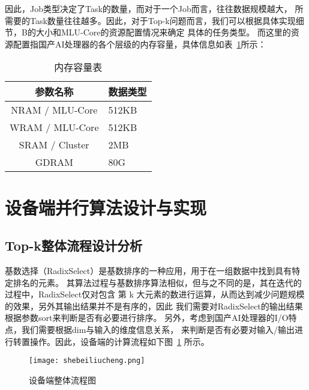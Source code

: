         因此，Job类型决定了Task的数量，而对于一个Job而言，往往数据规模越大，
        所需要的Task数量往往越多。因此，对于Top-k问题而言，我们可以根据具体实现细节，B的大小和MLU-Core的资源配置情况来确定
        具体的任务类型。
        而这里的资源配置指国产AI处理器的各个层级的内存容量，具体信息如表~\ref{tab:duiqi}所示：


\begin{table}
    \centering
    \caption{内存容量表}
    \label{tab:duiqi}
    \begin{tabular}{cl} %
      \toprule
      参数名称   & 数据类型        \\
      \midrule
      NRAM / MLU-Core & 512KB     \\
      WRAM / MLU-Core   & 512KB   \\
      SRAM / Cluster& 2MB         \\
      GDRAM       &  80G \\
      \bottomrule
    \end{tabular}
\end{table}
   



\section{设备端并行算法设计与实现}

\subsection{Top-k整体流程设计分析}





基数选择（RadixSelect）是基数排序的一种应用，用于在一组数据中找到具有特定排名的元素。
其算法过程与基数排序算法相似，但与之不同的是，其在迭代的过程中，RadixSelect仅对包含
第 k 大元素的数进行运算，从而达到减少问题规模的效果，另外其输出结果并不是有序的，因此
我们需要对RadixSelect的输出结果根据参数sort来判断是否有必要进行排序。
另外，考虑到国产AI处理器的I/O特点，我们需要根据dim与输入的维度信息关系，
来判断是否有必要对输入/输出进行转置操作。因此，设备端的计算流程如下图~\ref{fig:shebeiliucheng}
所示。

\begin{figure}[ht]
    \centering
    \texttt{[image: shebeiliucheng.png]}
    \caption{设备端整体流程图}
    \label{fig:shebeiliucheng}
\end{figure}


